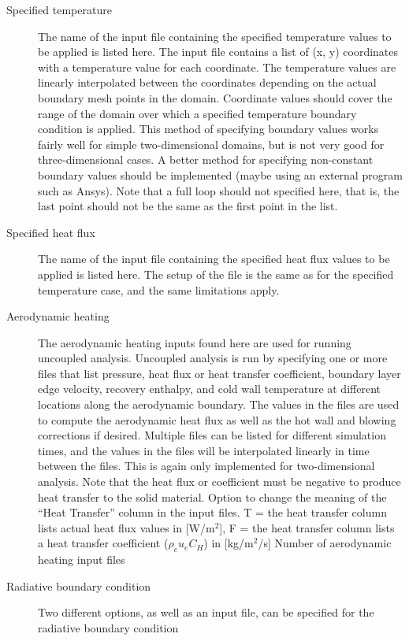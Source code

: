 \documentclass[]{article}
\begin{document}
\begin{description}
 \item [Specified temperature] The name of the input file containing the specified temperature values to be applied is listed here. The input file contains a list of (x, y) coordinates with a temperature value for each coordinate. The temperature values are linearly interpolated between the coordinates depending on the actual boundary mesh points in the domain. Coordinate values should cover the range of the domain over which a specified temperature boundary condition is applied. This method of specifying boundary values works fairly well for simple two-dimensional domains, but is not very good for three-dimensional cases. A better method for specifying non-constant boundary values should be implemented (maybe using an external program such as Ansys).  Note that a full loop should not specified here, that is, the last point should not be the same as the first point in the list.
 \item [Specified heat flux] The name of the input file containing the specified heat flux values to be applied is listed here. The setup of the file is the same as for the specified temperature case, and the same limitations apply.  
 \item [Aerodynamic heating] The aerodynamic heating inputs found here are used for running uncoupled analysis. Uncoupled analysis is run by specifying one or more files that list pressure, heat flux or heat transfer coefficient, boundary layer edge velocity, recovery enthalpy, and cold wall temperature at different locations along the aerodynamic boundary. The values in the files are used to compute the aerodynamic heat flux as well as the hot wall and blowing corrections if desired. Multiple files can be listed for different simulation times, and the values in the files will be interpolated linearly in time between the files.  This is again only implemented for two-dimensional analysis.  Note that the heat flux or coefficient must be negative to produce heat transfer to the solid material.
 \subitem [LSUB] Option to change the meaning of the ``Heat Transfer'' column in the input files. T = the heat transfer column lists actual heat flux values in [W/m$^2$], F = the heat transfer column lists a heat transfer coefficient ($\rho_e u_e C_H$) in [kg/m$^2$/s]
 \subitem [nTimes] Number of aerodynamic heating input files
 \item [Radiative boundary condition]Two different options, as well as an input file, can be specified for the radiative boundary condition

\end{description}
\end{document}
